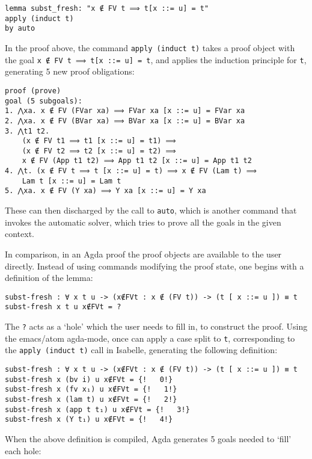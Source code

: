 \documentclass[a4paper, 12pt, twoside]{style/ociamthesis}
\let\OldTexttt\texttt
\renewcommand{\texttt}[1]{\small\OldTexttt{#1}}
\begin{document}
\begin{verbatim}
lemma subst_fresh: "x ∉ FV t ⟹ t[x ::= u] = t"
apply (induct t)
by auto
\end{verbatim}

In the proof above, the command \texttt{apply (induct t)} takes a proof
object with the goal \texttt{x ∉ FV t ⟹ t[x ::= u] = t}, and applies the
induction principle for \texttt{t}, generating 5 new proof obligations:

\begin{verbatim}
proof (prove)
goal (5 subgoals):
1. ⋀xa. x ∉ FV (FVar xa) ⟹ FVar xa [x ::= u] = FVar xa
2. ⋀xa. x ∉ FV (BVar xa) ⟹ BVar xa [x ::= u] = BVar xa
3. ⋀t1 t2.
    (x ∉ FV t1 ⟹ t1 [x ::= u] = t1) ⟹
    (x ∉ FV t2 ⟹ t2 [x ::= u] = t2) ⟹
    x ∉ FV (App t1 t2) ⟹ App t1 t2 [x ::= u] = App t1 t2
4. ⋀t. (x ∉ FV t ⟹ t [x ::= u] = t) ⟹ x ∉ FV (Lam t) ⟹ 
    Lam t [x ::= u] = Lam t
5. ⋀xa. x ∉ FV (Y xa) ⟹ Y xa [x ::= u] = Y xa
\end{verbatim}

These can then discharged by the call to \texttt{auto}, which is another
command that invokes the automatic solver, which tries to prove all the
goals in the given context.

In comparison, in an Agda proof the proof objects are available to the
user directly. Instead of using commands modifying the proof state, one
begins with a definition of the lemma:

\begin{verbatim}
subst-fresh : ∀ x t u -> (x∉FVt : x ∉ (FV t)) -> (t [ x ::= u ]) ≡ t
subst-fresh x t u x∉FVt = ?
\end{verbatim}

The \texttt{?} acts as a `hole' which the user needs to fill in, to
construct the proof. Using the emacs/atom agda-mode, once can apply a
case split to \texttt{t}, corresponding to the \texttt{apply (induct t)}
call in Isabelle, generating the following definition:

\begin{verbatim}
subst-fresh : ∀ x t u -> (x∉FVt : x ∉ (FV t)) -> (t [ x ::= u ]) ≡ t
subst-fresh x (bv i) u x∉FVt = {!   0!}
subst-fresh x (fv x₁) u x∉FVt = {!   1!}
subst-fresh x (lam t) u x∉FVt = {!   2!}
subst-fresh x (app t t₁) u x∉FVt = {!   3!}
subst-fresh x (Y t₁) u x∉FVt = {!   4!}
\end{verbatim}

When the above definition is compiled, Agda generates 5 goals needed to
`fill' each hole:
\end{document}
